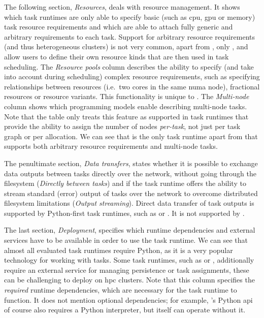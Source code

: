 The following section, \emph{Resources}, deals with resource management. It shows which
task runtimes are only able to specify basic (such as \gls{cpu},
\gls{gpu} or memory) task resource requirements and which are able to attach fully
generic and arbitrary requirements to each task. Support for arbitrary resource requirements (and
thus heterogeneous clusters) is not very common, apart from \hyperqueue{}, only
\dask{}, \ray{} and \snakemake{} allow users to
define their own resource kinds that are then used in task scheduling. The \emph{Resource pools}
column describes the ability to specify (and take into account during scheduling) complex resource
requirements, such as specifying relationships between resources (i.e.\ two cores in the same
\gls{numa} node), fractional resources or resource variants. This functionality is
unique to \hyperqueue{}. The \emph{Multi-node} column shows which programming
models enable describing multi-node tasks. Note that the table only treats this feature as
supported in task runtimes that provide the ability to assign the number of nodes
\emph{per-task}, not just per task graph or per allocation. We can see that
\snakemake{} is the only task runtime apart from \hyperqueue{} that supports
both arbitrary resource requirements and multi-node tasks.

The penultimate section, \emph{Data transfers}, states whether it is possible to exchange data
outputs between tasks directly over the network, without going through the filesystem
(\emph{Directly between tasks}) and if the task runtime offers the ability to stream standard (error)
output of tasks over the network to overcome distributed filesystem limitations
(\emph{Output streaming}). Direct data transfer of task outputs is supported by Python-first task
runtimes, such as \dask{} or \ray{}. It is not supported by
\hyperqueue{}.

The last section, \emph{Deployment}, specifies which runtime dependencies and external
services have to be available in order to use the task runtime. We can see that almost all
evaluated task runtimes require Python, as it is a very popular technology for working with tasks.
Some task runtimes, such as \merlin{} or \fireworks{}, additionally
require an external service for managing persistence or task assignments, these can be challenging
to deploy on \gls{hpc} clusters. Note that this column specifies the
\emph{required} runtime dependencies, which are necessary for the task runtime to
function. It does not mention optional dependencies; for example, \hyperqueue{}'s Python
\gls{api} of course also requires a Python interpreter, but \hyperqueue{}
itself can operate without it.

